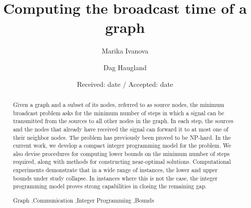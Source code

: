 \documentclass[preprint,12pt,review]{elsarticle}
\begin{document}
\begin{frontmatter}

\title{Computing the broadcast time of a graph}

\author{Marika Ivanova}

\author{Dag Haugland}

\address{Department of Informatics, University of Bergen, Norway}


\date{Received: date / Accepted: date}

\begin{abstract}
Given a graph and a subset of its nodes, referred to as source nodes, the minimum broadcast problem asks for the minimum number of steps in which a signal can be transmitted from the sources to all other nodes in the graph.
In each step, the sources and the nodes that already have received the signal can forward it to at most one of their neighbor nodes.
The problem has previously been proved to be NP-hard. 
In the current work, we develop a compact integer programming model for the problem.
We also devise procedures for computing lower bounds on the minimum number of steps required, along with methods for constructing near-optimal solutions.
Computational experiments demonstrate that in a wide range of instances, the lower and upper bounds under study collapse.
In instances where this is not the case, the integer programming model proves strong capabilities in closing the remaining gap.

\begin{keyword}
Graph \sep Communication \sep Integer Programming \sep Bounds
\end{keyword}
\end{abstract}
\end{frontmatter}








\end{document}
